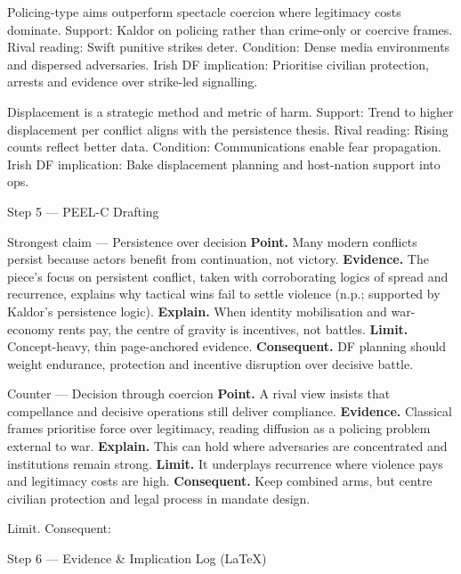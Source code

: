 Policing-type aims outperform spectacle coercion where legitimacy costs dominate.
Support: Kaldor on policing rather than crime-only or coercive frames.
Rival reading: Swift punitive strikes deter.
Condition: Dense media environments and dispersed adversaries.
Irish DF implication: Prioritise civilian protection, arrests and evidence over strike-led signalling.

Displacement is a strategic method and metric of harm.
Support: Trend to higher displacement per conflict aligns with the persistence thesis.
Rival reading: Rising counts reflect better data.
Condition: Communications enable fear propagation.
Irish DF implication: Bake displacement planning and host-nation support into ops.

Step 5 — PEEL-C Drafting

Strongest claim — Persistence over decision
\textbf{Point.} Many modern conflicts persist because actors benefit from continuation, not victory.
\textbf{Evidence.} The piece’s focus on persistent conflict, taken with corroborating logics of spread and recurrence, explains why tactical wins fail to settle violence (n.p.; supported by Kaldor’s persistence logic).
\textbf{Explain.} When identity mobilisation and war-economy rents pay, the centre of gravity is incentives, not battles.
\textbf{Limit.} Concept-heavy, thin page-anchored evidence.
\textbf{Consequent.} DF planning should weight endurance, protection and incentive disruption over decisive battle.

Counter — Decision through coercion
\textbf{Point.} A rival view insists that compellance and decisive operations still deliver compliance.
\textbf{Evidence.} Classical frames prioritise force over legitimacy, reading diffusion as a policing problem external to war.
\textbf{Explain.} This can hold where adversaries are concentrated and institutions remain strong.
\textbf{Limit.} It underplays recurrence where violence pays and legitimacy costs are high.
\textbf{Consequent.} Keep combined arms, but centre civilian protection and legal process in mandate design.

Limit. Consequent:

Step 6 — Evidence & Implication Log (LaTeX)

